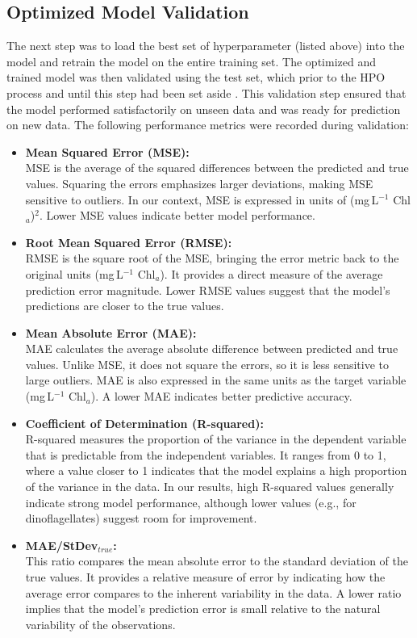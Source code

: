 \documentclass[
]{agujournal2019}
\begin{document}
\subsection{Optimized Model
Validation}\label{optimized-model-validation}

The next step was to load the best set of hyperparameter (listed above)
into the model and retrain the model on the entire training set. The
optimized and trained model was then validated using the test set, which
prior to the HPO process and until this step had been set aside . This
validation step ensured that the model performed satisfactorily on
unseen data and was ready for prediction on new data. The following
performance metrics were recorded during validation:

\begin{itemize}
\item
  \textbf{Mean Squared Error (MSE):}\\
  MSE is the average of the squared differences between the predicted
  and true values. Squaring the errors emphasizes larger deviations,
  making MSE sensitive to outliers. In our context, MSE is expressed in
  units of (mg\,L\(^{-1}\) Chl\(_a\))\(^2\). Lower MSE values indicate
  better model performance.
\item
  \textbf{Root Mean Squared Error (RMSE):}\\
  RMSE is the square root of the MSE, bringing the error metric back to
  the original units (mg\,L\(^{-1}\) Chl\(_a\)). It provides a direct
  measure of the average prediction error magnitude. Lower RMSE values
  suggest that the model's predictions are closer to the true values.
\item
  \textbf{Mean Absolute Error (MAE):}\\
  MAE calculates the average absolute difference between predicted and
  true values. Unlike MSE, it does not square the errors, so it is less
  sensitive to large outliers. MAE is also expressed in the same units
  as the target variable (mg\,L\(^{-1}\) Chl\(_a\)). A lower MAE
  indicates better predictive accuracy.
\item
  \textbf{Coefficient of Determination (R-squared):}\\
  R-squared measures the proportion of the variance in the dependent
  variable that is predictable from the independent variables. It ranges
  from 0 to 1, where a value closer to 1 indicates that the model
  explains a high proportion of the variance in the data. In our
  results, high R-squared values generally indicate strong model
  performance, although lower values (e.g., for dinoflagellates) suggest
  room for improvement.
\item
  \textbf{MAE/StDev\(_{true}\):}\\
  This ratio compares the mean absolute error to the standard deviation
  of the true values. It provides a relative measure of error by
  indicating how the average error compares to the inherent variability
  in the data. A lower ratio implies that the model's prediction error
  is small relative to the natural variability of the observations.
\end{itemize}
\end{document}
